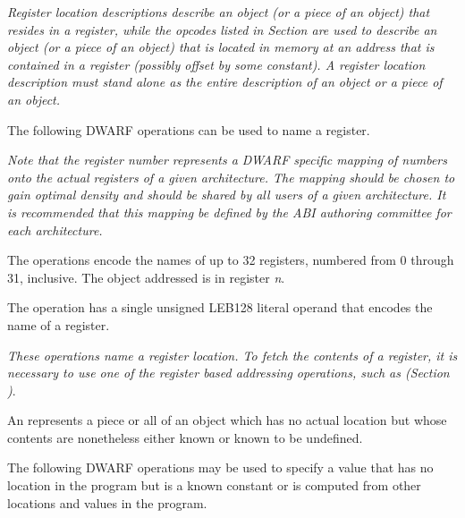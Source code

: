 \textit{Register location descriptions describe an object
(or a piece of an object) that resides in a register, while
the opcodes listed in 
Section 
are used to describe an object (or a piece of
an object) that is located in memory at an address that is
contained in a register (possibly offset by some constant). A
register location description must stand alone as the entire
description of an object or a piece of an object.
}

The following DWARF operations can be used to name a register.


\textit{Note that the register number represents a DWARF specific
mapping of numbers onto the actual registers of a given
architecture. The mapping should be chosen to gain optimal
density and should be shared by all users of a given
architecture. It is recommended that this mapping be defined
by the ABI authoring committee for each architecture.
}
\begin{enumerate}[1. ]
The \DWOPregnTARG{} operations encode the names of up to 32
registers, numbered from 0 through 31, inclusive. The object
addressed is in register \textit{n}.

\itembfnl{\DWOPregxTARG}
The \DWOPregxTARG{} operation has a single 
unsigned LEB128 literal
operand that encodes the name of a register.  

\end{enumerate}

\textit{These operations name a register location. To
fetch the contents of a register, it is necessary to use
one of the register based addressing operations, such as
\DWOPbregx{} 
(Section )}.

An 
represents a piece or all
of an object which has no actual location but whose contents
are nonetheless either known or known to be undefined.

The following DWARF operations may be used to specify a value
that has no location in the program but is a known constant
or is computed from other locations and values in the program.

